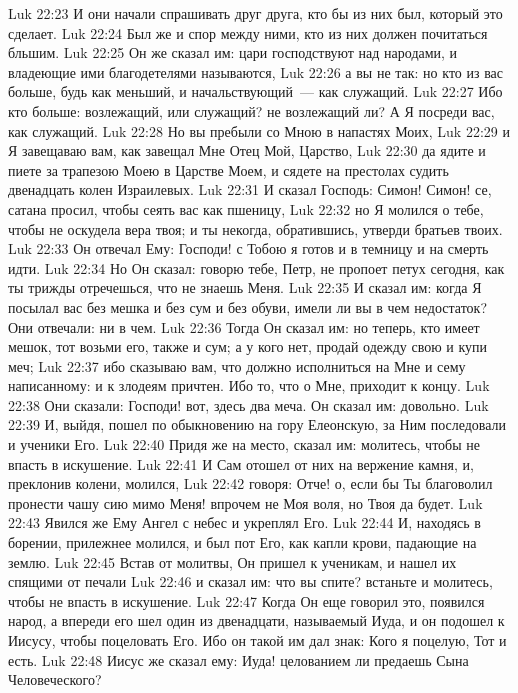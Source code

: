 \vs Luk 22:23 И они начали спрашивать друг друга, кто бы из них был, который это сделает.
\vs Luk 22:24 Был же и спор между ними, кто из них должен почитаться бльшим.
\vs Luk 22:25 Он же сказал им: цари господствуют над народами, и владеющие ими благодетелями называются,
\vs Luk 22:26 а вы не так: но кто из вас больше, будь как меньший, и начальствующий~--- как служащий.
\vs Luk 22:27 Ибо кто больше: возлежащий, или служащий? не возлежащий ли? А Я посреди вас, как служащий.
\vs Luk 22:28 Но вы пребыли со Мною в напастях Моих,
\vs Luk 22:29 и Я завещаваю вам, как завещал Мне Отец Мой, Царство,
\vs Luk 22:30 да ядите и пиете за трапезою Моею в Царстве Моем, и сядете на престолах судить двенадцать колен Израилевых.
\vs Luk 22:31 И сказал Господь: Симон! Симон! се, сатана просил, чтобы сеять вас как пшеницу,
\vs Luk 22:32 но Я молился о тебе, чтобы не оскудела вера твоя; и ты некогда, обратившись, утверди братьев твоих.
\vs Luk 22:33 Он отвечал Ему: Господи! с Тобою я готов и в темницу и на смерть идти.
\vs Luk 22:34 Но Он сказал: говорю тебе, Петр, не пропоет петух сегодня, как ты трижды отречешься, что не знаешь Меня.
\vs Luk 22:35 И сказал им: когда Я посылал вас без мешка и без сум и без обуви, имели ли вы в чем недостаток? Они отвечали: ни в чем.
\vs Luk 22:36 Тогда Он сказал им: но теперь, кто имеет мешок, тот возьми его, также и сум; а у кого нет, продай одежду свою и купи меч;
\vs Luk 22:37 ибо сказываю вам, что должно исполниться на Мне и сему написанному: и к злодеям причтен. Ибо то, что о Мне, приходит к концу.
\vs Luk 22:38 Они сказали: Господи! вот, здесь два меча. Он сказал им: довольно.
\rsbpar\vs Luk 22:39 И, выйдя, пошел по обыкновению на гору Елеонскую, за Ним последовали и ученики Его.
\vs Luk 22:40 Придя же на место, сказал им: молитесь, чтобы не впасть в искушение.
\vs Luk 22:41 И Сам отошел от них на вержение камня, и, преклонив колени, молился,
\vs Luk 22:42 говоря: Отче! о, если бы Ты благоволил пронести чашу сию мимо Меня! впрочем не Моя воля, но Твоя да будет.
\vs Luk 22:43 Явился же Ему Ангел с небес и укреплял Его.
\vs Luk 22:44 И, находясь в борении, прилежнее молился, и был пот Его, как капли крови, падающие на землю.
\vs Luk 22:45 Встав от молитвы, Он пришел к ученикам, и нашел их спящими от печали
\vs Luk 22:46 и сказал им: что вы спите? встаньте и молитесь, чтобы не впасть в искушение.
\rsbpar\vs Luk 22:47 Когда Он еще говорил это, появился народ, а впереди его шел один из двенадцати, называемый Иуда, и он подошел к Иисусу, чтобы поцеловать Его. Ибо он такой им дал знак: Кого я поцелую, Тот и есть.
\vs Luk 22:48 Иисус же сказал ему: Иуда! целованием ли предаешь Сына Человеческого?

